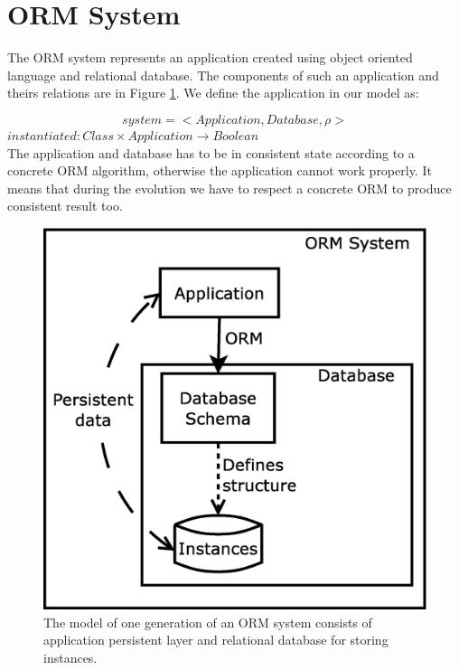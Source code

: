 \documentclass[11pt]{article}
\begin{document}
\tableofcontents

\newpage
\section{ORM System}
The ORM system represents an application created using object oriented language and relational database. The components of such an application and theirs relations are in Figure \ref{fig:appStructure}. We define the application in our model as:

$$system = < Application, Database, \rho >$$
$instantiated : Class \times Application \rightarrow Boolean $ \\

The application and database has to be in consistent state according to a concrete ORM algorithm, otherwise the application cannot work properly. It means that during the evolution we have to respect a concrete ORM to produce consistent result too.

\begin{figure}
\begin{center}
	\includegraphics[scale=0.3]{./images/system}
	\caption{The model of one generation of an ORM system consists of application persistent layer and relational database for storing instances.}
\end{center}
	\label{fig:appStructure}
\end{figure}
\end{document}

